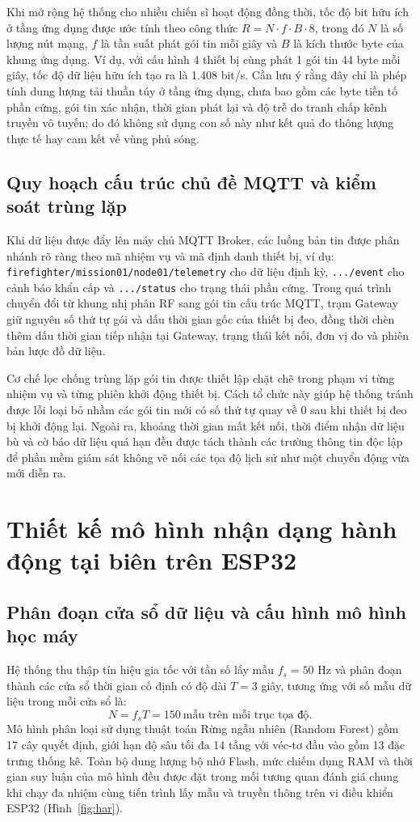 Khi mở rộng hệ thống cho nhiều chiến sĩ hoạt động đồng thời, tốc độ bit hữu ích ở tầng ứng dụng được ước tính theo công thức $R=N \cdot f \cdot B \cdot 8$, trong đó $N$ là số lượng nút mạng, $f$ là tần suất phát gói tin mỗi giây và $B$ là kích thước byte của khung ứng dụng. Ví dụ, với cấu hình 4 thiết bị cùng phát 1 gói tin 44 byte mỗi giây, tốc độ dữ liệu hữu ích tạo ra là 1.408 bit/s. Cần lưu ý rằng đây chỉ là phép tính dung lượng tải thuần túy ở tầng ứng dụng, chưa bao gồm các byte tiền tố phần cứng, gói tin xác nhận, thời gian phát lại và độ trễ do tranh chấp kênh truyền vô tuyến; do đó không sử dụng con số này như kết quả đo thông lượng thực tế hay cam kết về vùng phủ sóng.

\subsection{Quy hoạch cấu trúc chủ đề MQTT và kiểm soát trùng lặp}
Khi dữ liệu được đẩy lên máy chủ MQTT Broker, các luồng bản tin được phân nhánh rõ ràng theo mã nhiệm vụ và mã định danh thiết bị, ví dụ: \nolinkurl{firefighter/mission01/node01/telemetry} cho dữ liệu định kỳ, \texttt{.../event} cho cảnh báo khẩn cấp và \texttt{.../status} cho trạng thái phần cứng. Trong quá trình chuyển đổi từ khung nhị phân RF sang gói tin cấu trúc MQTT, trạm Gateway giữ nguyên số thứ tự gói và dấu thời gian gốc của thiết bị đeo, đồng thời chèn thêm dấu thời gian tiếp nhận tại Gateway, trạng thái kết nối, đơn vị đo và phiên bản lược đồ dữ liệu.

Cơ chế lọc chống trùng lặp gói tin được thiết lập chặt chẽ trong phạm vi từng nhiệm vụ và từng phiên khởi động thiết bị. Cách tổ chức này giúp hệ thống tránh được lỗi loại bỏ nhầm các gói tin mới có số thứ tự quay về 0 sau khi thiết bị đeo bị khởi động lại. Ngoài ra, khoảng thời gian mất kết nối, thời điểm nhận dữ liệu bù và cờ báo dữ liệu quá hạn đều được tách thành các trường thông tin độc lập để phần mềm giám sát không vẽ nối các tọa độ lịch sử như một chuyển động vừa mới diễn ra.

\section{Thiết kế mô hình nhận dạng hành động tại biên trên ESP32}\label{sec:har}
\subsection{Phân đoạn cửa sổ dữ liệu và cấu hình mô hình học máy}
Hệ thống thu thập tín hiệu gia tốc với tần số lấy mẫu $f_s=50$ Hz và phân đoạn thành các cửa sổ thời gian cố định có độ dài $T=3$ giây, tương ứng với số mẫu dữ liệu trong mỗi cửa sổ là:
\begin{equation}
N=f_sT=150\ \text{mẫu trên mỗi trục tọa độ}.
\end{equation}
Mô hình phân loại sử dụng thuật toán Rừng ngẫu nhiên (Random Forest) gồm 17 cây quyết định, giới hạn độ sâu tối đa 14 tầng với véc-tơ đầu vào gồm 13 đặc trưng thống kê. Toàn bộ dung lượng bộ nhớ Flash, mức chiếm dụng RAM và thời gian suy luận của mô hình đều được đặt trong mối tương quan đánh giá chung khi chạy đa nhiệm cùng tiến trình lấy mẫu và truyền thông trên vi điều khiển ESP32 (Hình~\ref{fig:har}).

